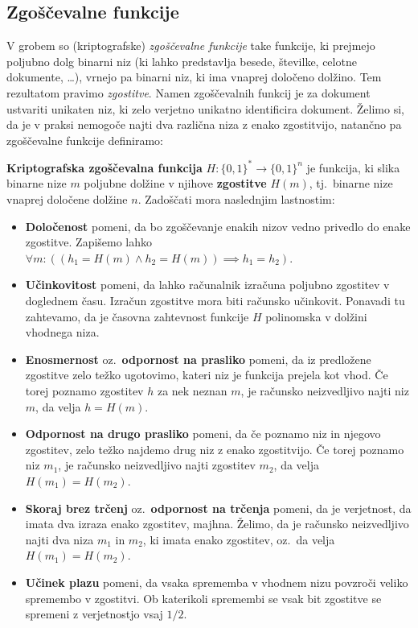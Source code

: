 \documentclass[isrm2, tisk]{fmfdelo}
\begin{document}
\subsection{Zgoščevalne funkcije}
V grobem so (kriptografske) \textit{zgoščevalne funkcije} take funkcije, ki prejmejo poljubno dolg binarni 
niz (ki lahko predstavlja besede, številke, celotne dokumente, \dots), vrnejo pa binarni niz, ki ima
vnaprej določeno dolžino. Tem rezultatom pravimo \textit{zgostitve}. Namen zgoščevalnih funkcij je 
za dokument ustvariti unikaten niz, ki zelo verjetno unikatno identificira dokument. Želimo si, da
je v praksi nemogoče najti dva različna niza z enako zgostitvijo, natančno pa zgoščevalne funkcije
definiramo:

\begin{definicija} 
\label{def:hash}
    \textbf{Kriptografska zgoščevalna funkcija} $H: \{0, 1\}^* \rightarrow \{0, 1\}^n$ je funkcija, 
    ki slika binarne nize $m$ poljubne dolžine v njihove \textbf{zgostitve} $H(m)$, tj.\ binarne nize 
    vnaprej določene dolžine $n$. Zadoščati mora naslednjim lastnostim:
    \begin{itemize}
        \item \textbf{Določenost} pomeni, da bo zgoščevanje enakih nizov vedno privedlo do enake 
            zgostitve. Zapišemo lahko $\forall m: ((h_1 = H(m) \wedge h_2 = H(m)) \implies h_1 = h_2)$.
        \item \textbf{Učinkovitost} pomeni, da lahko računalnik izračuna poljubno zgostitev v doglednem 
            času. Izračun zgostitve mora biti računsko učinkovit. Ponavadi tu zahtevamo, da je časovna
            zahtevnost funkcije $H$ polinomska v dolžini vhodnega niza.
        \item \textbf{Enosmernost} oz.\ \textbf{odpornost na prasliko} pomeni, da iz predložene 
            zgostitve zelo težko ugotovimo, kateri niz je funkcija prejela kot vhod. Če torej poznamo 
            zgostitev $h$ za nek neznan $m$, je računsko neizvedljivo najti niz $m$, da velja $h = H(m)$.
        \item \textbf{Odpornost na drugo prasliko} pomeni, da če poznamo niz in njegovo zgostitev, 
            zelo težko najdemo drug niz z enako zgostitvijo. Če torej poznamo niz $m_1$, je računsko 
            neizvedljivo najti zgostitev $m_2$, da velja $H(m_1) = H(m_2)$.
        \item \textbf{Skoraj brez trčenj} oz.\ \textbf{odpornost na trčenja} pomeni, da je verjetnost,
            da imata dva izraza enako zgostitev, majhna. Želimo, da je računsko neizvedljivo
            najti dva niza  $m_1$ in $m_2$, ki imata enako zgostitev, oz.\ da velja $H(m_1) = H(m_2)$.
        \item \textbf{Učinek plazu} pomeni, da vsaka sprememba v vhodnem nizu povzroči veliko spremembo 
            v zgostitvi. Ob katerikoli spremembi se vsak bit zgostitve se spremeni z verjetnostjo 
            vsaj $1/2$.
    \end{itemize}
\end{definicija}
\end{document}
